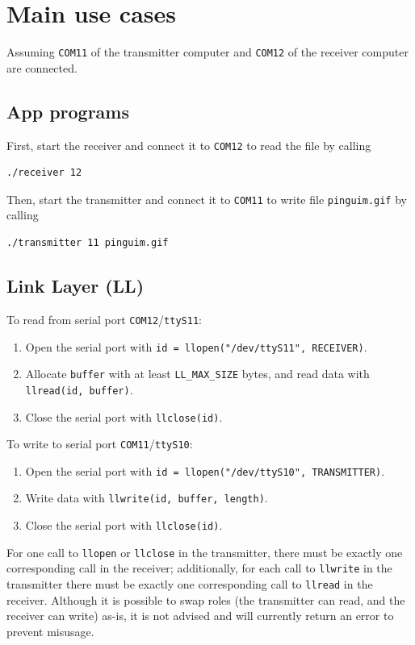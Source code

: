 \documentclass[a4paper, 11pt]{report}
\begin{document}
\section{Main use cases} \label{sec:UseCases}

Assuming \texttt{COM11} of the transmitter computer and \texttt{COM12} of the receiver computer are connected.

\subsection{App programs}

First, start the receiver and connect it to \texttt{COM12} to read the file by calling

\begin{lstlisting}[frame=none, numbers=none]
./receiver 12
\end{lstlisting}
Then, start the transmitter and connect it to \texttt{COM11} to write file \texttt{pinguim.gif} by calling

\begin{lstlisting}[frame=none, numbers=none]
./transmitter 11 pinguim.gif
\end{lstlisting}
	
\subsection{Link Layer (LL)}

To read from serial port \texttt{COM12}/\texttt{ttyS11}:
\begin{enumerate}
	\item Open the serial port with \texttt{id = llopen("/dev/ttyS11", RECEIVER)}.
	\item Allocate \texttt{buffer} with at least \texttt{LL\_MAX\_SIZE} bytes, and read data with \texttt{llread(id, buffer)}.
	\item Close the serial port with \texttt{llclose(id)}.
\end{enumerate}
To write to serial port \texttt{COM11}/\texttt{ttyS10}:
\begin{enumerate}
	\item Open the serial port with \texttt{id = llopen("/dev/ttyS10", TRANSMITTER)}.
	\item Write data with \texttt{llwrite(id, buffer, length)}.
	\item Close the serial port with \texttt{llclose(id)}.
\end{enumerate}

For one call to \texttt{llopen} or \texttt{llclose} in the transmitter, there must be exactly one corresponding call in the receiver; additionally, for each call to \texttt{llwrite} in the transmitter there must be exactly one corresponding call to \texttt{llread} in the receiver. Although it is possible to swap roles (the transmitter can read, and the receiver can write) as-is, it is not advised and will currently return an error to prevent misusage.
\end{document}
